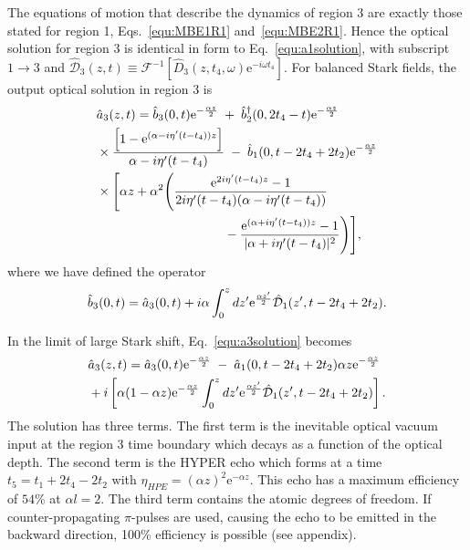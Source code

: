 \documentclass[superscriptaddress,pra,twocolumn,showpacs,amsmath,amssymb,aps,a4paper]{revtex4}
\begin{document}
The equations of motion that describe the dynamics of region 3 are
exactly those stated for region 1, Eqs.~\ref{equ:MBE1R1} and~\ref{equ:MBE2R1}. Hence the
optical solution for region 3 is identical in form to
Eq.~\ref{equ:a1solution}, with subscript $1\to 3$ and
$\hat{\mathcal{D}}_3(z,t) \equiv
\mathcal{F}^{-1}\left[\hat{D}_3(z,t_4,\omega)\text{e}^{-i\omega
    t_4}\right]$.  For balanced Stark fields, the output optical
solution in region 3 is
\begin{align} \label{equ:a3solution}
&\hat{a}_3(z,t) = \hat{b}_3(0,t) \text{e}^{-\frac{\alpha z}{2}} \;+\; \hat{b}^{\dagger}_2(0,2t_4-t) \text{e}^{-\frac{\alpha z}{2}} \notag \\
&\times \frac{\left[ 1-\text{e}^{(\alpha - i\eta' (t-t_4))z} \right]}{{\alpha} - i{\eta'}(t-t_4)} \;-\; \hat{b}_1(0,t-2t_4 + 2t_2)\text{e}^{-\frac{\alpha z}{2}}\notag \\
&\times \Bigg[ \alpha z + \alpha^2\Bigg( \frac{\text{e}^{2i\eta'(t - t_4)z} - 1}{2i\eta' (t-t_4)(\alpha - i\eta'(t-t_4))} \notag \\
& \qquad\qquad\qquad\qquad\qquad- \frac{\text{e}^{(\alpha + i\eta' (t-t_4))z} - 1}{|\alpha + i\eta' (t-t_4)|^2} \Bigg) \Bigg],
\end{align}
where  we have defined the operator
\begin{equation}
\hat{b}_3(0,t) = \hat{a}_3(0,t) + i\alpha \int^{z}_0 dz' \text{e}^{\frac{\alpha z'}{2}} \hat{\mathcal{D}}_1(z',t-2t_4+2t_2).\notag
\end{equation}

In the limit of large Stark shift, Eq.~\ref{equ:a3solution} becomes
\begin{align} \label{equ:a3solution2}
&\hat{a}_3(z,t) = \hat{a}_3(0,t) \text{e}^{-\frac{\alpha z}{2}} \;-\; \hat{a}_1(0,t-2t_4 + 2t_2)\alpha z \text{e}^{-\frac{\alpha z}{2}} \notag \\
&+ i\left[ \alpha(1 - \alpha z)\text{e}^{-\frac{\alpha z}{2}} \int^{z}_0 dz' \text{e}^{\frac{\alpha z'}{2}} \hat{\mathcal{D}}_1(z',t-2t_4 + 2t_2)\right].
\end{align}
The solution has three terms. The first term is the inevitable optical
vacuum input at the region 3 time boundary which decays as a function
of the optical depth. The second term is the HYPER echo which forms at
a time $t_5 = t_1 + 2t_4 - 2t_2$ with $\eta_{HPE} = (\alpha
z)^2\text{e}^{-\alpha z}$. This echo has a maximum efficiency of $54\%$
at $\alpha l = 2$. The third term contains the atomic degrees of
freedom. If counter-propagating $\pi$-pulses are used, causing the echo to be emitted in the backward direction, 100\% efficiency is possible (see appendix).
\end{document}
